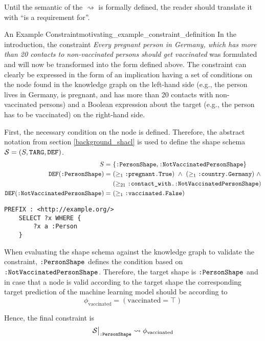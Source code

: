 Until the semantic of the $\rightsquigarrow$ is formally defined, the reader should translate it with ``is a requirement for''. 

\begin{Bsp}{An Example Constraint}{motivating_example_constraint_definition}
In the introduction, the constraint \glqq{}\emph{Every pregnant person in Germany, which has more than 20 contacts to non-vaccinated persons should get vaccinated}\grqq{} was formulated and will now be transformed into the form defined above. The constraint can clearly be expressed in the form of an implication having a set of conditions on the node found in the knowledge graph on the left-hand side (e.g., the person lives in Germany, is pregnant, and has more than 20 contacts with non-vaccinated persons) and a Boolean expression about the target (e.g., the person has to be vaccinated) on the right-hand side.

First, the necessary condition on the node is defined. Therefore, the abstract notation from section \ref{background_shacl} is used to define the shape schema $\mathcal{S} = (S, \texttt{TARG}, \texttt{DEF})$.
\begin{align*}
    S = ~ & \{\texttt{:PersonShape}, \texttt{:NotVaccinatedPersonShape}\}\\
    \texttt{DEF}(\texttt{:PersonShape}) = ~ & (\geq_1 \texttt{:pregnant.True}) ~\land~ (\geq_1 \texttt{:country.Germany})~ \land\\ 
                                      & (\geq_{21} \texttt{:contact\_with.:NotVaccinatedPersonShape})\\
    \texttt{DEF}(\texttt{:NotVaccinatedPersonShape}) = ~ & (\geq_1 \texttt{:vaccinated.False})
\end{align*}
    \lstset{language=html}
    \begin{lstlisting}[captionpos=b, caption=\uri{TARG}(\uri{:PersonShape}) and \uri{TARG}(\uri{:NotVaccinatedPersonShape}), basicstyle=\ttfamily, frame=single]
    PREFIX : <http://example.org/>
    SELECT ?x WHERE {
        ?x a :Person
    }
    \end{lstlisting}

When evaluating the shape schema against the knowledge graph to validate the constraint, $\texttt{:PersonShape}$ defines the condition based on $\texttt{:NotVaccinatedPersonShape}$. Therefore, the target shape is $\texttt{:PersonShape}$ and in case that a node is valid according to the target shape the corresponding target prediction of the machine learning model should be according to \[\phi_{\text{vaccinated}} = (\text{vaccinated} = \top)\]

Hence, the final constraint is \[\mathcal{S}\big|_{\texttt{:PersonShape}} \rightsquigarrow \phi_{\text{vaccinated}}\]
\end{Bsp}

